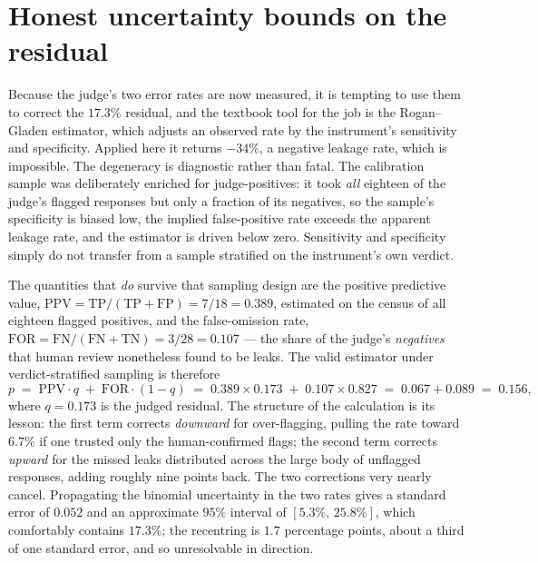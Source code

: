 \documentclass[11pt,a4paper]{report}
\begin{document}
\section{Honest uncertainty bounds on the residual}
\label{sec:ch5-bounds}

Because the judge's two error rates are now measured, it is tempting to use them to correct
the $17.3\%$ residual, and the textbook tool for the job is the Rogan--Gladen estimator,
which adjusts an observed rate by the instrument's sensitivity and specificity. Applied here
it returns $-34\%$, a negative leakage rate, which is impossible. The degeneracy is
diagnostic rather than fatal. The calibration sample was deliberately enriched for
judge-positives: it took \emph{all} eighteen of the judge's flagged responses but only a
fraction of its negatives, so the sample's specificity is biased low, the implied
false-positive rate exceeds the apparent leakage rate, and the estimator is driven below
zero. Sensitivity and specificity simply do not transfer from a sample stratified on the
instrument's own verdict.

The quantities that \emph{do} survive that sampling design are the positive predictive value,
$\mathrm{PPV} = \mathrm{TP}/(\mathrm{TP}+\mathrm{FP}) = 7/18 = 0.389$, estimated on the census of all
eighteen flagged positives, and the false-omission rate,
$\mathrm{FOR} = \mathrm{FN}/(\mathrm{FN}+\mathrm{TN}) = 3/28 = 0.107$ --- the share of the judge's
\emph{negatives} that human review nonetheless found to be leaks. The valid
estimator under verdict-stratified sampling is therefore
\[
  p \;=\; \mathrm{PPV}\cdot q \;+\; \mathrm{FOR}\cdot(1-q)
    \;=\; 0.389 \times 0.173 \;+\; 0.107 \times 0.827
    \;=\; 0.067 + 0.089 \;=\; 0.156,
\]
where $q = 0.173$ is the judged residual. The structure of the calculation is its lesson: the
first term corrects \emph{downward} for over-flagging, pulling the rate toward $6.7\%$ if one
trusted only the human-confirmed flags; the second term corrects \emph{upward} for the missed
leaks distributed across the large body of unflagged responses, adding roughly nine points
back. The two corrections very nearly cancel. Propagating the binomial uncertainty in the two
rates gives a standard error of $0.052$ and an approximate $95\%$ interval of
$[5.3\%,\,25.8\%]$, which comfortably contains $17.3\%$; the recentring is $1.7$ percentage
points, about a third of one standard error, and so unresolvable in direction.
\end{document}

